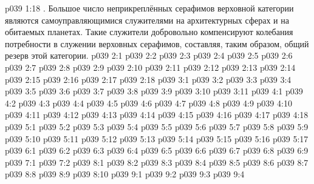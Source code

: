 \vs p039 1:18 . Большое число неприкреплённых серафимов верховной категории являются самоуправляющимися служителями на архитектурных сферах и на обитаемых планетах. Такие служители добровольно компенсируют колебания потребности в служении верховных серафимов, составляя, таким образом, общий резерв этой категории.
\vs p039 2:1 
\vs p039 2:2 
\vs p039 2:3 
\vs p039 2:4 
\vs p039 2:5 
\vs p039 2:6 
\vs p039 2:7 
\vs p039 2:8 
\vs p039 2:9 \pc 
\vs p039 2:10 \pc 
\vs p039 2:11 
\vs p039 2:12 
\vs p039 2:13 \pc 
\vs p039 2:14 
\vs p039 2:15 \pc 
\vs p039 2:16 
\vs p039 2:17 
\vs p039 2:18 \pc 
{}
\vs p039 3:1 
\vs p039 3:2 
\vs p039 3:3 
\vs p039 3:4 
\vs p039 3:5 
\vs p039 3:6 
\vs p039 3:7 
\vs p039 3:8 
\vs p039 3:9 
\vs p039 3:10 
\vs p039 3:11 
\vs p039 4:1 
\vs p039 4:2 
\vs p039 4:3 
\vs p039 4:4 
\vs p039 4:5 
\vs p039 4:6 
\vs p039 4:7 
\vs p039 4:8 
\vs p039 4:9 
\vs p039 4:10 
\vs p039 4:11 
\vs p039 4:12 \pc 
\vs p039 4:13 
\vs p039 4:14 
\vs p039 4:15 
\vs p039 4:16 
\vs p039 4:17 
\vs p039 4:18 
\vs p039 5:1 
\vs p039 5:2 
\vs p039 5:3 
\vs p039 5:4 
\vs p039 5:5 
\vs p039 5:6 
\vs p039 5:7 
\vs p039 5:8 
\vs p039 5:9 
\vs p039 5:10 
\vs p039 5:11 \pc 
\vs p039 5:12 
\vs p039 5:13 \pc 
\vs p039 5:14 
\vs p039 5:15 \pc 
\vs p039 5:16 
\vs p039 5:17 
\vs p039 6:1 
\vs p039 6:2 
\vs p039 6:3 
\vs p039 6:4 
\vs p039 6:5 
\vs p039 6:6 
\vs p039 6:7 
\vs p039 6:8 
\vs p039 6:9 \pc 
{}
\vs p039 7:1 
\vs p039 7:2 
\vs p039 8:1 
\vs p039 8:2 \pc 
\vs p039 8:3 
\vs p039 8:4 
\vs p039 8:5 
\vs p039 8:6 
\vs p039 8:7 \pc 
\vs p039 8:8 
\vs p039 8:9 \pc 
\vs p039 8:10 
\vs p039 9:1 
\vs p039 9:2 
\vs p039 9:3 
\vsetoff
\vs p039 9:4 
\quizlink

